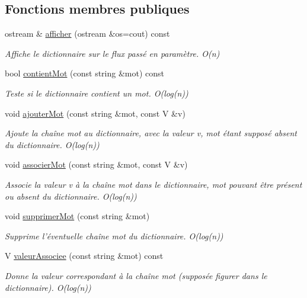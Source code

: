 \subsection*{Fonctions membres publiques}
\begin{DoxyCompactItemize}
\item 
ostream \& \hyperlink{classtree__dictionnaire_af8386fa4ca1a5d86ca73d2e1f7845999}{afficher} (ostream \&os=cout) const 
\begin{DoxyCompactList}\small\item\em Affiche le dictionnaire sur le flux passé en paramètre. O(n) \end{DoxyCompactList}\item 
bool \hyperlink{classtree__dictionnaire_a688203a2da7bbc1bdb667868ef6e18a3}{contient\-Mot} (const string \&mot) const 
\begin{DoxyCompactList}\small\item\em Teste si le dictionnaire contient un mot. O(log(n)) \end{DoxyCompactList}\item 
void \hyperlink{classtree__dictionnaire_a867e2a62ee1defe00f00c08e170192d1}{ajouter\-Mot} (const string \&mot, const V \&v)
\begin{DoxyCompactList}\small\item\em Ajoute la chaîne mot au dictionnaire, avec la valeur v, mot étant supposé absent du dictionnaire. O(log(n)) \end{DoxyCompactList}\item 
void \hyperlink{classtree__dictionnaire_afc52a48eea27916d31c7088813e83fd0}{associer\-Mot} (const string \&mot, const V \&v)
\begin{DoxyCompactList}\small\item\em Associe la valeur v à la chaîne mot dans le dictionnaire, mot pouvant être présent ou absent du dictionnaire. O(log(n)) \end{DoxyCompactList}\item 
void \hyperlink{classtree__dictionnaire_a76fa52ac010b861d437b87d1b68fe0cc}{supprimer\-Mot} (const string \&mot)
\begin{DoxyCompactList}\small\item\em Supprime l'éventuelle chaîne mot du dictionnaire. O(log(n)) \end{DoxyCompactList}\item 
V \hyperlink{classtree__dictionnaire_a7fb5e78b2bf0d5e75c9aebb870d43879}{valeur\-Associee} (const string \&mot) const 
\begin{DoxyCompactList}\small\item\em Donne la valeur correspondant à la chaîne mot (supposée figurer dans le dictionnaire). O(log(n)) \end{DoxyCompactList}\item 

\end{DoxyCompactItemize}
